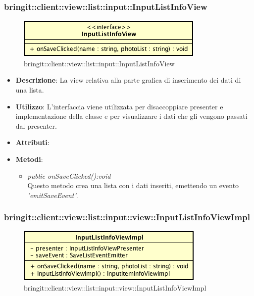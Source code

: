 \subsubsection{bringit::client::view::list::input::InputListInfoView}

\label{bringit::client::view::list::input::InputListInfoView}
\begin{figure}[H]
	\centering
	\includegraphics[scale=0.5]{Sezioni/SottosezioniST/img/app/InputListInfoView.png}
	\caption{bringit::client::view::list::input::InputListInfoView}
\end{figure}

\begin{itemize}
\item \textbf{Descrizione}: La view relativa alla parte grafica di inserimento dei dati di una lista.
\item \textbf{Utilizzo}: L'interfaccia viene utilizzata per disaccoppiare presenter e implementazione della classe e per visualizzare i dati che gli vengono passati dal presenter.
\item \textbf{Attributi}: 
\item \textbf{Metodi}:
	\begin{itemize}
	\item \textit{public onSaveClicked():void}\\
	Questo metodo crea una lista con i dati inseriti, emettendo un evento \textit{'emitSaveEvent'}.
	\end{itemize}
\end{itemize} 

\subsubsection{bringit::client::view::list::input::view::InputListInfoViewImpl}

\label{bringit::client::view::list::input::view::InputListInfoViewImpl}
\begin{figure}[H]
	\centering
	\includegraphics[scale=0.5]{Sezioni/SottosezioniST/img/app/InputListInfoViewImpl.png}
	\caption{bringit::client::view::list::input::view::InputListInfoViewImpl}
\end{figure}

